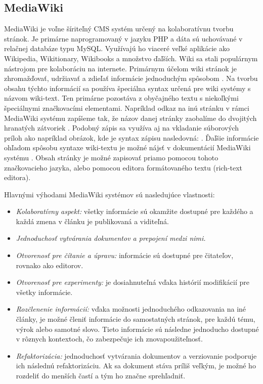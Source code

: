 \subsection{MediaWiki}
MediaWiki je voľne šíriteľný CMS systém určený na kolaboratívnu tvorbu stránok. Je primárne naprogramovaný v jazyku PHP a dáta sú uchovávané v relačnej databáze typu MySQL. Využívajú ho viaceré veľké aplikácie ako Wikipedia, Wikitionary, Wikibooks a množstvo ďaľších. 
Wiki sa stali populárnym nástrojom pre kolaboráciu na internete. Primárnym účelom wiki stránok je zhromažďovať, udržiavať a zdieľať informácie jednoduchým spôsobom \cite{krotzsch2006semantic}. Na tvorbu obsahu týchto informácií sa používa špeciálna syntax určená pre wiki systémy s názvom wiki-text. Ten primárne pozostáva z obyčajného textu s niekoľkými špeciálnymi značkovacími elementami. Napríklad odkaz na inú stránku v rámci MediaWiki systému zapíšeme tak, že názov danej stránky zaobalíme do dvojitých hranatých zátvoriek . Podobný zápis sa využíva aj na vkladanie súborových príloh ako napríklad obrázok, kde je syntax zápisu nasledovná: . Ďaľšie informácie ohľadom spôsobu syntaxe wiki-textu je možné nájsť v dokumentácií MediaWiki systému \citep{MediaWikiHelpFormating}. Obsah stránky je možné zapisovať priamo pomocou tohoto značkovacieho jazyka, alebo pomocou editora formátovaného textu (rich-text editora).

Hlavnými výhodami MediaWiki systémov sú nasledujúce vlastnosti:
\begin{itemize}
	\item \textit{Kolaboratívny aspekt:} všetky informácie sú okamžite dostupné pre každého a každá zmena v článku je publikovaná a viditeľná.
	\item \textit{Jednoduchosť vytvárania dokumentov a prepojení medzi nimi.}
	\item \textit{Otvorenosť pre čítanie a úpravu:} informácie sú dostupné pre čitateľov, rovnako ako editorov.
	\item \textit{Otvorenosť pre experimenty:} je dosiahnuteľná vďaka histórií modifikácií pre všetky informácie.
	\item \textit{Rozčlenenie informácií:} vďaka možnosti jednoduchého odkazovania na iné články, je možné členiť informácie do samostatných stránok, pre každú tému, výrok alebo samotné slovo. Tieto informácie sú následne jednoducho dostupné v rôznych kontextoch, čo zabezpečuje ich znovapoužiteľnosť.
	\item \textit{Refaktorizácia:} jednoduchosť vytvárania dokumentov a verziovanie podporuje ich následnú refaktorizáciu. Ak sa dokument stáva príliš veľkým, je možné ho rozdeliť do menších častí a tým ho značne sprehľadniť.
\end{itemize}

